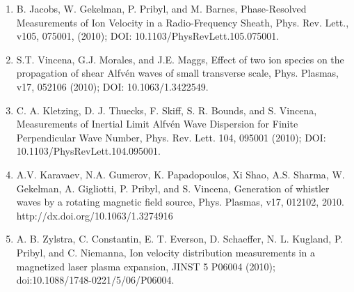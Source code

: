 \documentclass[11pt]{article}
\begin{document}
\begin{enumerate}
\item   B. Jacobs, W. Gekelman, P. Pribyl, and M. Barnes, Phase-Resolved Measurements of Ion Velocity in a Radio-Frequency Sheath, Phys. Rev. Lett., v105, 075001, (2010); DOI: 10.1103/PhysRevLett.105.075001.

\item   S.T. Vincena, G.J. Morales, and J.E. Maggs, Effect of two ion species on the propagation of shear Alfv\'{e}n waves of small transverse scale, Phys. Plasmas, v17, 052106 (2010); DOI: 10.1063/1.3422549.

\item   C. A. Kletzing, D. J. Thuecks, F. Skiff, S. R. Bounds, and S. Vincena, Measurements of Inertial Limit Alfv\'{e}n Wave Dispersion for Finite Perpendicular Wave Number, Phys. Rev. Lett. 104, 095001 (2010); DOI: 10.1103/PhysRevLett.104.095001.

\item  A.V. Karavaev, N.A. Gumerov, K. Papadopoulos, Xi Shao, A.S. Sharma, W. Gekelman, A. Gigliotti, P. Pribyl, and S. Vincena, Generation of whistler waves by a rotating magnetic field source, Phys. Plasmas, v17, 012102, 2010. http://dx.doi.org/10.1063/1.3274916

\item  A. B. Zylstra, C. Constantin, E. T. Everson, D. Schaeffer, N. L. Kugland, P. Pribyl, and C. Niemanna, Ion velocity distribution measurements in a magnetized laser plasma expansion, JINST 5 P06004 (2010); doi:10.1088/1748-0221/5/06/P06004.

\end{enumerate}
	


%
%
%
%  
\end{document}
